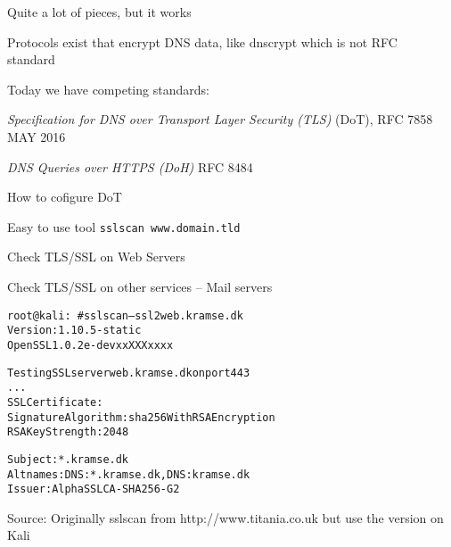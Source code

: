 \documentclass[Screen16to9,17pt]{foils}
\begin{document}
\centerline{Quite a lot of pieces, but it works}





\begin{list1}
\item Protocols exist that encrypt DNS data, like dnscrypt which is not RFC\\ standard  
\item Today we have competing standards:
\item
\emph{Specification for DNS over Transport Layer Security (TLS)} (DoT), RFC 7858 MAY 2016\\

\item \emph{DNS Queries over HTTPS (DoH)} RFC 8484

\item How to cofigure DoT 
\end{list1}






\begin{list2}
\item Easy to use tool \verb+sslscan www.domain.tld+
\item Check TLS/SSL on Web Servers
\item Check TLS/SSL on other services -- Mail servers
\end{list2}


\begin{alltt}\small
root@kali:~# sslscan --ssl2 web.kramse.dk
Version: 1.10.5-static
OpenSSL 1.0.2e-dev xx XXX xxxx

Testing SSL server web.kramse.dk on port 443
...
  SSL Certificate:
Signature Algorithm: sha256WithRSAEncryption
RSA Key Strength:    2048

Subject:  *.kramse.dk
Altnames: DNS:*.kramse.dk, DNS:kramse.dk
Issuer:   AlphaSSL CA - SHA256 - G2
\end{alltt}

Source:
Originally sslscan from http://www.titania.co.uk
 but use the version on Kali
\end{document}
